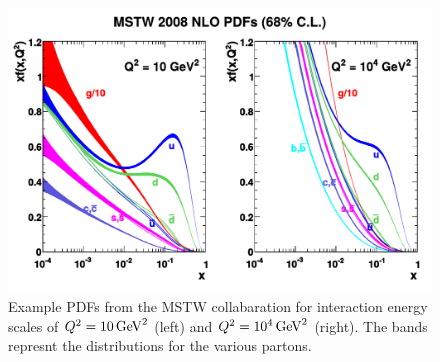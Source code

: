 \begin{figure}[!htbs]
    \centering
    \includegraphics[width=\textwidth]{figures/mstw_pdfs.pdf}
    \caption[
        Example PDFs from the MSTW collabaration.
    ]{
        Example PDFs from the MSTW collabaration for interaction energy scales
        of $Q^{2} = 10 \,\text{Ge\hspace{-.08em}V}^{2}$ (left) and $Q^{2} =
        10^{4} \,\text{Ge\hspace{-.08em}V}^{2}$ (right). The bands represnt the 
        distributions for the various partons.
    }
    \label{fig:mstw_pdf}
\end{figure}
